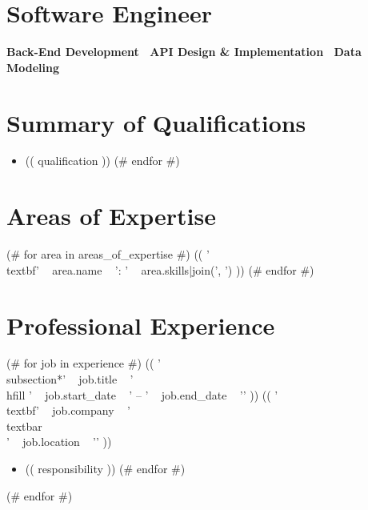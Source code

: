 \documentclass[a4paper,10pt]{article}
\begin{document}
\begin{center}
\end{center}

\section*{Software Engineer}
\begin{center}
\textbf{Back-End Development \textbar\ API Design \& Implementation \textbar\ Data Modeling}
\end{center}

\section*{Summary of Qualifications}
\begin{itemize}[itemsep=0em]
(# for qualification in summary_of_qualifications #)
    \item (( qualification )) 
(# endfor #)
\end{itemize}

\section*{Areas of Expertise}
\begin{minipage}{\textwidth}
\raggedright
(# for area in areas_of_expertise #)
    (( '\\textbf{' ~ area.name ~ ':} ' ~ area.skills|join(', ') ))
(# endfor #)
\end{minipage}

\section*{Professional Experience}
(# for job in experience #)
    (( '\\subsection*{' ~ job.title ~ '\\hfill ' ~ job.start_date ~ ' -- ' ~ job.end_date ~ '}' ))
(( '\\textbf{' ~ job.company ~ ' \\textbar\\ ' ~ job.location ~ '}' ))
\begin{itemize}[itemsep=0em]
  (# for responsibility in job.responsibilities #)
  \item (( responsibility ))
  (# endfor #)
\end{itemize}
(# endfor #)
\end{document}
